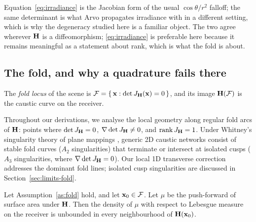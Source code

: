 Equation~\eqref{eq:irradiance} is the Jacobian form of the usual
$\cos\theta / r^2$ falloff; the same determinant is what Arvo
\cite{arvo1994} propagates irradiance with in a different setting, which is why
the degeneracy studied here is a familiar object. The two agree wherever $\mathbf{H}$ is a diffeomorphism;
\eqref{eq:irradiance} is preferable here because it remains meaningful as a
statement about rank, which is what the fold is about.

\subsection{The fold, and why a quadrature fails there}
\label{sec:fold}

\begin{definition}
\label{def:fold}
The \emph{fold locus} of the scene is
$\mathcal{F} = \{\,\mathbf{x} : \det J_{\mathbf{H}}(\mathbf{x}) = 0\,\}$, and its image
$\mathbf{H}(\mathcal{F})$ is the caustic curve on the receiver.
\end{definition}

\begin{assumption}
\label{as:fold}
Throughout our derivations, we analyse the local geometry along regular fold arcs of $\mathbf{H}$:
points where $\det J_{\mathbf{H}} = 0$, $\nabla \det J_{\mathbf{H}} \neq 0$, and $\operatorname{rank} J_{\mathbf{H}} = 1$.
Under Whitney's singularity theory of plane mappings \cite{whitney1955,golubitsky1986,berry1980,nye1999},
generic 2D caustic networks consist of stable fold curves ($A_2$ singularities) that
terminate or intersect at isolated cusps ($A_3$ singularities, where $\nabla \det J_{\mathbf{H}} = 0$).
Our local 1D transverse correction addresses the dominant fold lines; isolated cusp
singularities are discussed in Section~\ref{sec:limits-fold}.
\end{assumption}

\begin{lemma}
\label{lem:diverge}
Let Assumption~\ref{as:fold} hold, and let $\mathbf{x}_0 \in \mathcal{F}$. Let
$\mu$ be the push-forward of surface area under $\mathbf{H}$. Then the density of
$\mu$ with respect to Lebesgue measure on the receiver is unbounded in every
neighbourhood of $\mathbf{H}(\mathbf{x}_0)$.
\end{lemma}

